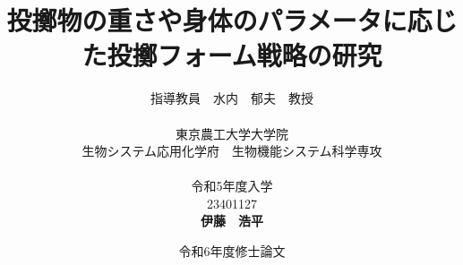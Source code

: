


\usepackage{ikuo}%

\usepackage[dvipdfmx]{hyperref}  %
\usepackage{pxjahyper} %
\hypersetup{colorlinks=true}
\hypersetup{linkcolor=black}
\hypersetup{urlcolor=black}
\hypersetup{citecolor=black}

\usepackage{url} %

\newcommand{\FIGDIR}{./fig}        %


\date{令和6年度修士論文}
\title{投擲物の重さや身体のパラメータに応じた投擲フォーム戦略の研究}
\author{指導教員　水内　郁夫　教授 \\
\ \\
東京農工大学大学院　\\
生物システム応用化学府　生物機能システム科学専攻　\\
\ \\
令和5年度入学\\
23401127\\
{\bf 伊藤　浩平}}


\setlength{\baselineskip}{20pt}
\maketitle
\tableofcontents










